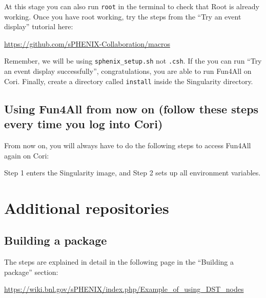 \documentclass[12pt]{article}
\begin{document}
At this stage you can also run \verb|root| in the terminal to check that Root is already working.
Once you have root working, try the steps from the ``Try an event display'' tutorial here:

\href{https://github.com/sPHENIX-Collaboration/macros}{https://github.com/sPHENIX-Collaboration/macros}

Remember, we will be using \verb|sphenix_setup.sh| not \verb|.csh|. If the you can run ``Try an event display successfully'', congratulations, you are able to run Fun4All on Cori.
Finally, create a directory called \verb|install| inside the Singularity directory.

\subsection{Using Fun4All from now on (follow these steps every time you log into Cori)}
\label{sec:every_login}

From now on, you will always have to do the following steps to access Fun4All again on Cori:

\begin{tcolorbox}
\end{tcolorbox}

Step 1 enters the Singularity image, and Step 2 sets up all environment variables.

\newpage
\section{Additional repositories}

\subsection{Building a package}
\label{sec:build}

The steps are explained in detail in the following page in the ``Building a package'' section:

\href{https://wiki.bnl.gov/sPHENIX/index.php/Example_of_using_DST_nodes}{https://wiki.bnl.gov/sPHENIX/index.php/Example\_of\_using\_DST\_nodes}
\end{document}

